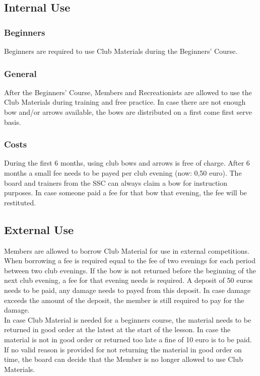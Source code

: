 \documentclass[a4paper]{article}
\begin{document}
\subsection{Internal Use}
\subsubsection{Beginners}
Beginners are required to use Club Materials during the Beginners' Course.

\subsubsection{General}
After the Beginners' Course, Members and Recreationists are allowed to use the Club Materials during training and free practice. In case there are not enough bow and/or arrows available, the bows are distributed on a first come first serve basis.

\subsubsection{Costs}
During the first 6 months, using club bows and arrows is free of charge. After 6 months a small fee needs to be payed per club evening (now: 0,50 euro). The board and trainers from the SSC can always claim a bow for instruction purposes. In case someone paid a fee for that bow that evening, the fee will be restituted.

\subsection{External Use}
Members are allowed to borrow Club Material for use in external competitions. When borrowing a fee is required equal to the fee of two evenings for each period between two club evenings. If the bow is not returned before the beginning of the next club evening, a fee for that evening needs is required. A deposit of 50 euros needs to be paid, any damage needs to payed from this deposit. In case damage exceeds the amount of the deposit, the member is still required to pay for the damage. \\

In case Club Material is needed for a beginners course, the material needs to be returned in good order at the latest at the start of the lesson. In case the material is not in good order or returned too late a fine of 10 euro is to be paid. If no valid reason is provided for not returning the material in good order on time, the board can decide that the Member is no longer allowed to use Club Materials.
\end{document}
